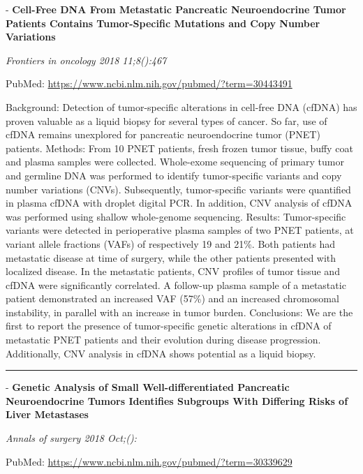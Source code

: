 \documentclass[]{article}
\begin{document}
 - \textbf{Cell-Free DNA From Metastatic Pancreatic Neuroendocrine Tumor
Patients Contains Tumor-Specific Mutations and Copy Number Variations}

\emph{Frontiers in oncology 2018 11;8():467}

PubMed: \url{https://www.ncbi.nlm.nih.gov/pubmed/?term=30443491}

Background: Detection of tumor-specific alterations in cell-free DNA
(cfDNA) has proven valuable as a liquid biopsy for several types of
cancer. So far, use of cfDNA remains unexplored for pancreatic
neuroendocrine tumor (PNET) patients. Methods: From 10 PNET patients,
fresh frozen tumor tissue, buffy coat and plasma samples were collected.
Whole-exome sequencing of primary tumor and germline DNA was performed
to identify tumor-specific variants and copy number variations (CNVs).
Subsequently, tumor-specific variants were quantified in plasma cfDNA
with droplet digital PCR. In addition, CNV analysis of cfDNA was
performed using shallow whole-genome sequencing. Results: Tumor-specific
variants were detected in perioperative plasma samples of two PNET
patients, at variant allele fractions (VAFs) of respectively 19 and
21\%. Both patients had metastatic disease at time of surgery, while the
other patients presented with localized disease. In the metastatic
patients, CNV profiles of tumor tissue and cfDNA were significantly
correlated. A follow-up plasma sample of a metastatic patient
demonstrated an increased VAF (57\%) and an increased chromosomal
instability, in parallel with an increase in tumor burden. Conclusions:
We are the first to report the presence of tumor-specific genetic
alterations in cfDNA of metastatic PNET patients and their evolution
during disease progression. Additionally, CNV analysis in cfDNA shows
potential as a liquid biopsy.

{}

{}

\begin{center}\rule{0.5\linewidth}{\linethickness}\end{center}

 - \textbf{Genetic Analysis of Small Well-differentiated Pancreatic
Neuroendocrine Tumors Identifies Subgroups With Differing Risks of Liver
Metastases}

\emph{Annals of surgery 2018 Oct;():}

PubMed: \url{https://www.ncbi.nlm.nih.gov/pubmed/?term=30339629}
\end{document}
